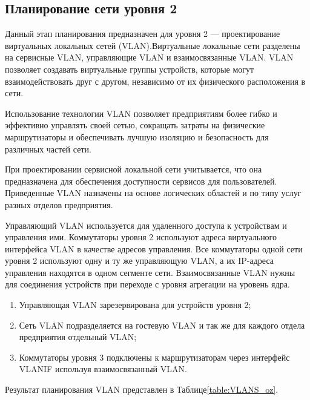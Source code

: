 \subsection{Планирование сети уровня 2}

Данный этап планирования предназначен для уровня 2 --- проектирование виртуальных локальных сетей (VLAN).Виртуальные локальные сети разделены на сервисные VLAN, управляющие VLAN и взаимосвязанные VLAN. VLAN позволяет создавать виртуальные группы устройств, которые могут взаимодействовать друг с другом, независимо от их физического расположения в сети.

Использование технологии VLAN\cite{query-theory} позволяет предприятиям более гибко и эффективно управлять своей сетью, сокращать затраты на физические маршрутизаторы и обеспечивать лучшую изоляцию и безопасность для различных частей сети.

При проектировании сервисной локальной сети учитывается, что она предназначена для обеспечения доступности сервисов для пользователей. Приведенные VLAN назначены на основе логических областей и по типу услуг разных отделов предприятия.

Управляющий VLAN используется для удаленного доступа к устройствам и управления ими. Коммутаторы уровня 2 используют адреса виртуального интерфейса VLAN в качестве адресов управления. Все коммутаторы одной сети уровня 2 используют одну и ту же управляющую VLAN, а их IP-адреса управления находятся в одном сегменте сети. Взаимосвязанные VLAN нужны для соединения устройств при переходе с уровня агрегации на уровень ядра.

\begin{enumerate}
        \item Управляющая VLAN зарезервирована для устройств уровня 2;
        \item Сеть VLAN подразделяется на гостевую VLAN и так же для каждого отдела предприятия отдельный VLAN;
        \item Коммутаторы уровня 3 подключены к маршрутизаторам через интерфейс VLANIF используя взаимосвязанный VLAN.
\end{enumerate}

Результат планирования VLAN представлен в Таблице\;\ref{table:VLANS_oz}.

